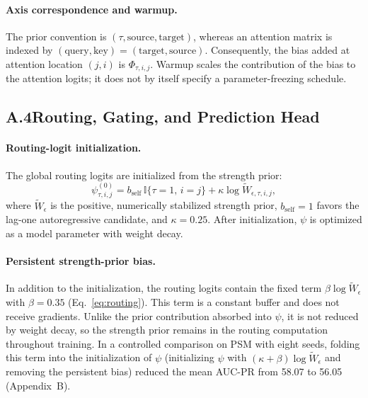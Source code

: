\documentclass[letterpaper]{article}
\newcommand{\Wts}{\widetilde{W}}
\begin{document}
\paragraph{Axis correspondence and warmup.}
The prior convention is $(\tau,\text{source},\text{target})$, whereas an attention matrix is indexed by $(\text{query},\text{key})=(\text{target},\text{source})$. Consequently, the bias added at attention location $(j,i)$ is $\Phi_{\tau,i,j}$. Warmup scales the contribution of the bias to the attention logits; it does not by itself specify a parameter-freezing schedule.

\subsection{A.4\quad Routing, Gating, and Prediction Head}

\paragraph{Routing-logit initialization.}
The global routing logits are initialized from the strength prior:
\begin{equation}
\psi^{(0)}_{\tau,i,j}=b_{\mathrm{self}}\,\mathbb{I}\{\tau=1,\,i=j\}+\kappa\log\Wts_{\epsilon,\tau,i,j},
\tag{A.13}
\end{equation}
where $\Wts_\epsilon$ is the positive, numerically stabilized strength prior, $b_{\mathrm{self}}=1$ favors the lag-one autoregressive candidate, and $\kappa=0.25$. After initialization, $\psi$ is optimized as a model parameter with weight decay.

\paragraph{Persistent strength-prior bias.}
In addition to the initialization, the routing logits contain the fixed term $\beta\log\Wts_\epsilon$ with $\beta=0.35$ (Eq.~\eqref{eq:routing}). This term is a constant buffer and does not receive gradients. Unlike the prior contribution absorbed into $\psi$, it is not reduced by weight decay, so the strength prior remains in the routing computation throughout training. In a controlled comparison on PSM with eight seeds, folding this term into the initialization of $\psi$ (initializing $\psi$ with $(\kappa+\beta)\log\Wts_\epsilon$ and removing the persistent bias) reduced the mean AUC-PR from 58.07 to 56.05 (Appendix~B).
\end{document}

